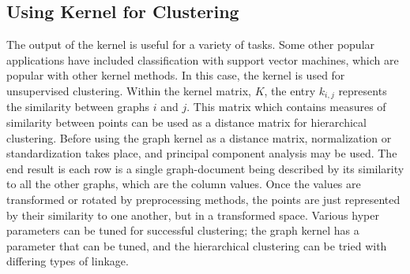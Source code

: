 
\subsection{Using Kernel for Clustering}

The output of the kernel is useful for a variety of tasks. Some other popular applications have included classification with support vector machines, which are popular with other kernel methods. In this case, the kernel is used for unsupervised clustering. Within the kernel matrix, $K$, the entry $k_{i,j}$ represents the similarity between graphs $i$ and $j$. This matrix which contains measures of similarity between points can be used as a distance matrix for hierarchical clustering. Before using the graph kernel as a distance matrix, normalization or standardization takes place, and principal component analysis may be used. The end result is each row is a single graph-document being described by its similarity to all the other graphs, which are the column values. Once the values are transformed or rotated by preprocessing methods, the points are just represented by their similarity to one another, but in a transformed space. Various hyper parameters can be tuned for successful clustering; the graph kernel has a parameter that can be tuned, and the hierarchical clustering can be tried with differing types of linkage.













